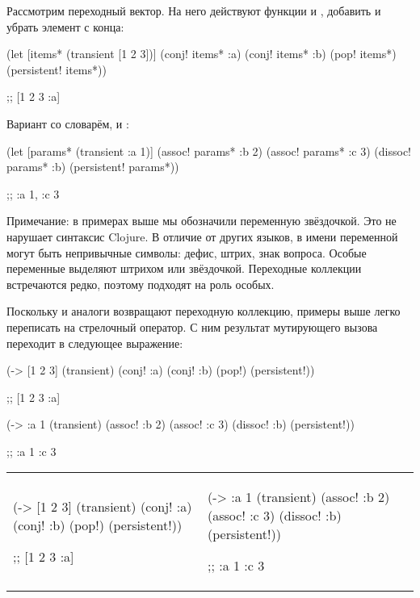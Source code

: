 Рассмотрим переходный вектор. На него действуют функции  и
, добавить и убрать элемент с конца:


\begin{clojure}
(let [items* (transient [1 2 3])]
  (conj! items* :a)
  (conj! items* :b)
  (pop! items*)
  (persistent! items*))

;; [1 2 3 :a]
\end{clojure}


\noindent
Вариант со словарём,  и :

\begin{clojure}
(let [params* (transient {:a 1})]
  (assoc! params* :b 2)
  (assoc! params* :c 3)
  (dissoc! params* :b)
  (persistent! params*))

;; {:a 1, :c 3}
\end{clojure}

Примечание: в примерах выше мы обозначили переменную звёздочкой. Это не нарушает
синтаксис Clojure. В отличие от других языков, в имени переменной могут быть
непривычные символы: дефис, штрих, знак вопроса. Особые переменные выделяют
штрихом или звёздочкой. Переходные коллекции встречаются редко, поэтому подходят
на роль особых.

Поскольку  и аналоги возвращают переходную коллекцию, примеры выше
легко переписать на стрелочный оператор. С ним результат мутирующего вызова
переходит в следующее выражение:

\label{thread-transient}

\ifnarrow

\begin{clojure}
(-> [1 2 3]
    (transient)
    (conj! :a)
    (conj! :b)
    (pop!)
    (persistent!))

;; [1 2 3 :a]
\end{clojure}

\splitter

\begin{clojure}
(-> {:a 1}
    (transient)
    (assoc! :b 2)
    (assoc! :c 3)
    (dissoc! :b)
    (persistent!))

;; {:a 1 :c 3}
\end{clojure}

\else

\noindent
\begin{tabular}{ @{}p{5cm} @{}p{5cm} }

\begin{clojure}
(-> [1 2 3]
    (transient)
    (conj! :a)
    (conj! :b)
    (pop!)
    (persistent!))

;; [1 2 3 :a]
\end{clojure}

&

\begin{clojure}
(-> {:a 1}
    (transient)
    (assoc! :b 2)
    (assoc! :c 3)
    (dissoc! :b)
    (persistent!))

;; {:a 1 :c 3}
\end{clojure}

\end{tabular}

